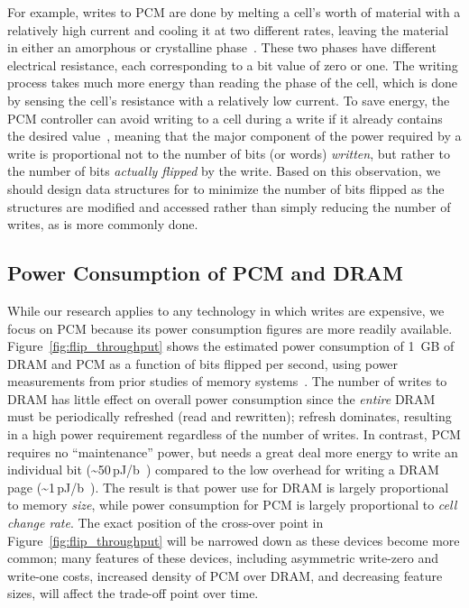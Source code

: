 For example, writes to PCM are done by melting a cell's worth of material with a
relatively high current and cooling it at two different rates, leaving the material
in either an amorphous or crystalline phase~\cite{raoux:ibmjrd08}.  These two
phases have different electrical resistance, each corresponding to a bit value
of zero or one.  The writing process takes much more energy than reading the
phase of the cell, which is done by sensing the cell's resistance with a
relatively low current. To save energy, the PCM controller can avoid writing to
a cell during a write if it already contains the desired
value~\cite{yang:iscas07}, meaning that the major component of the power
required by a write is proportional not to the number of bits (or words)
\emph{written}, but rather to the number of bits \emph{actually flipped} by the
write. Based on this observation, we should design data structures for \NVM to
minimize the number of bits flipped as the structures are modified and accessed
rather than simply reducing the number of writes, as is more commonly done.

\subsection{Power Consumption of PCM and DRAM}

While our research applies to any \NVM technology in which writes are expensive,
we focus on PCM because its power consumption figures are more readily
available. Figure~\ref{fig:flip_throughput} shows the estimated power consumption of 1~GB of DRAM and
PCM as a function of bits flipped per second, using power measurements from
prior studies of memory
systems~\cite{dhiman_pdram:_2009,lee_architecting_2009,xiangyu_dong_nvsim:_2012,qureshi_scalable_2009,Chen_rethinkingdatabase,bittman:nvmsa18}.
The number of writes to DRAM has little effect on overall power consumption
since the \emph{entire} DRAM must be periodically refreshed (read and
rewritten); refresh dominates, resulting in a high power requirement
regardless of the number of writes. In contrast, PCM requires no
``maintenance'' power, but needs a great deal more energy to write an
individual bit (\textasciitilde50\,pJ/b~\cite{bedeschi_8mb_2004}) compared to the
low overhead for writing a DRAM page
(\textasciitilde1\,pJ/b~\cite{lee_architecting_2009}).  The result is that power use
for DRAM is largely proportional to memory \emph{size}, while power consumption
for PCM is largely proportional to \emph{cell change rate}. The exact position of the cross-over
point in Figure~\ref{fig:flip_throughput} will be narrowed down as these devices become more common; many features of these devices,
including asymmetric write-zero and write-one costs, increased density of PCM over DRAM, and
decreasing feature sizes, will affect the trade-off point over time.

